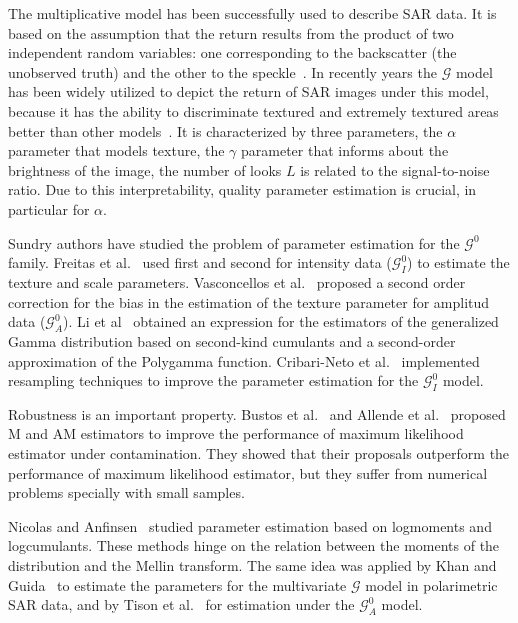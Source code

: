 \documentclass[technote,onecolumn,draftcls,12pt]{IEEEtran}
\numberwithin{equation}{section}
\begin{document}
The multiplicative model has been successfully used to describe SAR data. 
It is based on the assumption that the return results from the product of two independent random variables: 
one corresponding to the backscatter (the unobserved truth) 
and the other to the speckle~\cite{oliverquegan98}. 
In recently years the $\mathcal G$ model~\cite{Frery97} has been widely utilized to depict the return of SAR images under this model, because it has the ability to discriminate textured and extremely textured areas better than other models~\cite{MejailJacoboFreryBustos:IJRS}. 
It is characterized by three parameters, the $\alpha$ parameter that models texture, the $\gamma$ parameter that informs about the brightness of the image, the number of looks $L$ is related to the signal-to-noise ratio. 
Due to this interpretability, quality parameter estimation is crucial, in particular for $\alpha$.

Sundry authors have studied the problem of parameter estimation for the $\mathcal G^0$ family. 
Freitas et al.~\cite{Freitas2005} used first and second for intensity data ($\mathcal G_I^0$) to estimate the texture and scale parameters. 
Vasconcellos et al.~\cite{VasconcellosFrerySilva:CompStat} proposed a second order correction for the bias in the estimation of the texture parameter for amplitud data ($\mathcal G_A^0$).  
Li et al~\cite{Li2011} obtained an expression for the estimators of the generalized Gamma distribution based on second-kind cumulants and a second-order approximation of the Polygamma  function. 
Cribari-Neto et al.~\cite{CribariFrerySilva:CSDA} implemented resampling techniques to improve the parameter estimation for the $\mathcal G_I^0$ model. 

Robustness is an important property. 
Bustos et al.~\cite{BustosFreryLucini:Mestimators:2001} and Allende et al.~\cite{AllendeFreryetal:JSCS:05} proposed M and AM estimators to improve the performance of maximum likelihood estimator under contamination. 
They showed that their proposals outperform the performance of maximum likelihood estimator, but they suffer from numerical problems specially with small samples. 

Nicolas and Anfinsen~\cite{nicolas2002} studied parameter estimation based on logmoments and logcumulants. 
These methods hinge on the relation between the moments of the distribution and the Mellin transform. 
The same idea was applied by Khan and Guida~\cite{khan2014} to estimate the parameters for the multivariate $\mathcal{G}$ model in polarimetric SAR data, and by Tison et al.~\cite{Tison2004} for estimation under the $\mathcal G_A^0$ model. 
\end{document}

